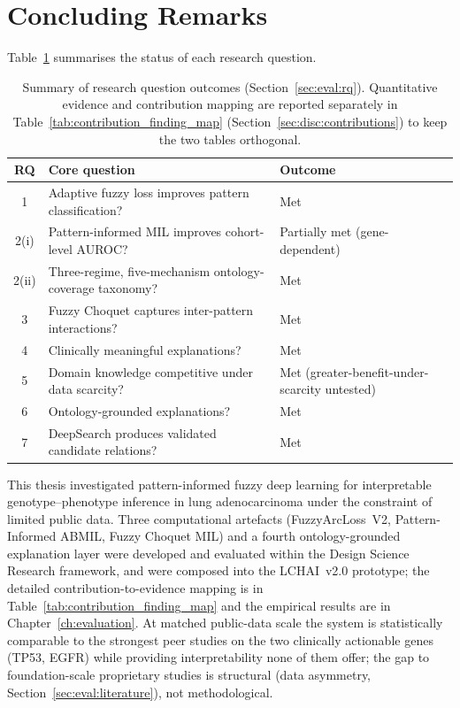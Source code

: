 \section{Concluding Remarks}
\label{sec:disc:conclusion}

Table~\ref{tab:rq_summary_ch7} summarises the status of each research
question.

\begin{table}[ht!]
\centering
\small
\caption[Summary of research question outcomes]{Summary of
research question outcomes
(Section~\ref{sec:eval:rq}).
Quantitative evidence and contribution mapping are reported
separately in Table~\ref{tab:contribution_finding_map}
(Section~\ref{sec:disc:contributions})
to keep the two tables orthogonal.}
\label{tab:rq_summary_ch7}
\renewcommand{\arraystretch}{1.15}
\begin{tabularx}{\textwidth}{@{}c X X@{}}
\hline
\textbf{RQ} & \textbf{Core question} & \textbf{Outcome} \\
\hline
1     & Adaptive fuzzy loss improves pattern classification?       & Met \\
2(i)  & Pattern-informed MIL improves cohort-level AUROC?          & Partially met (gene-dependent) \\
2(ii) & Three-regime, five-mechanism ontology-coverage taxonomy?   & Met \\
3     & Fuzzy Choquet captures inter-pattern interactions?         & Met \\
4     & Clinically meaningful explanations?                        & Met \\
5     & Domain knowledge competitive under data scarcity?          & Met (greater-benefit-under-scarcity untested) \\
6     & Ontology-grounded explanations?                            & Met \\
7     & DeepSearch produces validated candidate relations?         & Met \\
\hline
\end{tabularx}
\end{table}

This thesis investigated pattern-informed fuzzy deep learning for
interpretable genotype--phenotype inference in lung adenocarcinoma
under the constraint of limited public data.
Three computational artefacts (FuzzyArcLoss~V2, Pattern-Informed
ABMIL, Fuzzy Choquet MIL) and a fourth ontology-grounded
explanation layer were developed and evaluated within the Design
Science Research framework, and were composed into the LCHAI~v2.0
prototype; the detailed contribution-to-evidence mapping is in
Table~\ref{tab:contribution_finding_map} and the empirical results
are in Chapter~\ref{ch:evaluation}.
At matched public-data scale the system is statistically
comparable to the strongest peer studies on the two clinically
actionable genes (TP53, EGFR) while providing interpretability
none of them offer; the gap to foundation-scale proprietary
studies is structural (data asymmetry,
Section~\ref{sec:eval:literature}), not methodological.

